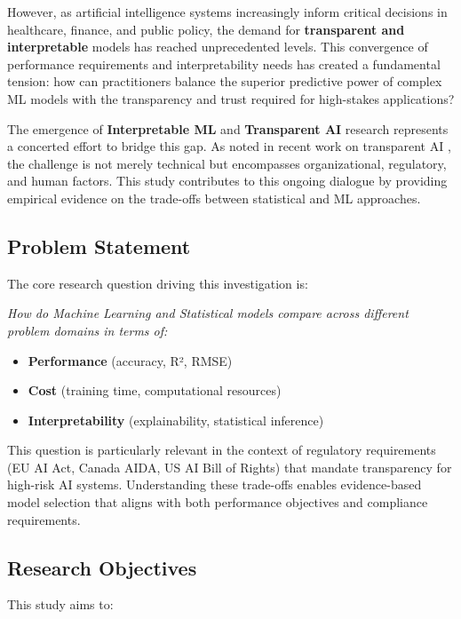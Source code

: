 \documentclass[11pt,a4paper]{article}
\begin{document}
However, as artificial intelligence systems increasingly inform critical decisions in healthcare, finance, and public policy, the demand for \textbf{transparent and interpretable} models has reached unprecedented levels. This convergence of performance requirements and interpretability needs has created a fundamental tension: how can practitioners balance the superior predictive power of complex ML models with the transparency and trust required for high-stakes applications?

The emergence of \textbf{Interpretable ML} and \textbf{Transparent AI} research represents a concerted effort to bridge this gap. As noted in recent work on transparent AI \cite{transparent_ai_2025}, the challenge is not merely technical but encompasses organizational, regulatory, and human factors. This study contributes to this ongoing dialogue by providing empirical evidence on the trade-offs between statistical and ML approaches.

\subsection{Problem Statement}

The core research question driving this investigation is:

\textit{How do Machine Learning and Statistical models compare across different problem domains in terms of:}
\begin{itemize}
    \item \textcolor{mlcolor}{\textbf{Performance}} (accuracy, R², RMSE)
    \item \textcolor{statcolor}{\textbf{Cost}} (training time, computational resources)
    \item \textcolor{accentcolor}{\textbf{Interpretability}} (explainability, statistical inference)
\end{itemize}

This question is particularly relevant in the context of regulatory requirements (EU AI Act, Canada AIDA, US AI Bill of Rights) that mandate transparency for high-risk AI systems. Understanding these trade-offs enables evidence-based model selection that aligns with both performance objectives and compliance requirements.

\subsection{Research Objectives}

This study aims to:
\end{document}
